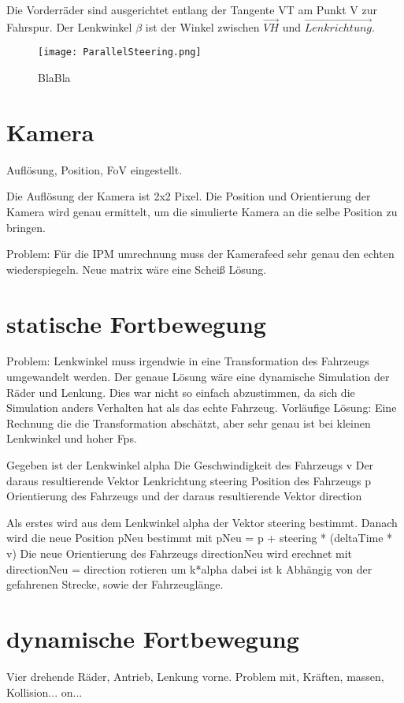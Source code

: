 Die Vorderräder sind ausgerichtet entlang der Tangente VT am Punkt V zur Fahrspur.
Der Lenkwinkel $\beta$ ist der Winkel zwischen $\vec{VH}$ und $\vec{Lenkrichtung}$. 

\begin{wrapfigure}{r}{.4\textwidth}
    \centering
    \texttt{[image: ParallelSteering.png]}
    \vspace{-15pt}
    \caption{BlaBla\footnotemark}
\end{wrapfigure}

\section{Kamera}
Auflösung, Position, FoV eingestellt.

Die Auflösung der Kamera ist 2x2 Pixel.
Die Position und Orientierung der Kamera wird genau ermittelt, um die simulierte Kamera an die selbe Position zu bringen.
 

Problem: Für die IPM umrechnung muss der Kamerafeed sehr genau den echten wiederspiegeln.
Neue matrix wäre eine Scheiß Lösung.


\section{statische Fortbewegung}
Problem: Lenkwinkel muss irgendwie in eine Transformation des Fahrzeugs umgewandelt werden.
Der genaue Lösung wäre eine dynamische Simulation der Räder und Lenkung.
Dies war nicht so einfach abzustimmen, da sich die Simulation anders Verhalten hat als das echte Fahrzeug.
Vorläufige Lösung: Eine Rechnung die die Transformation abschätzt, aber sehr genau ist bei kleinen Lenkwinkel und hoher Fps.

Gegeben ist der Lenkwinkel alpha
Die Geschwindigkeit des Fahrzeugs v
Der daraus resultierende Vektor Lenkrichtung steering
Position des Fahrzeugs p
Orientierung des Fahrzeugs und der daraus resultierende Vektor direction

Als erstes wird aus dem Lenkwinkel alpha der Vektor steering bestimmt.
Danach wird die neue Position pNeu bestimmt mit pNeu = p + steering * (deltaTime * v)
Die neue Orientierung des Fahrzeugs directionNeu wird erechnet mit directionNeu = direction rotieren um k*alpha
dabei ist k Abhängig von der gefahrenen Strecke, sowie der Fahrzeuglänge.

\section{dynamische Fortbewegung}
Vier drehende Räder, Antrieb, Lenkung vorne.
Problem mit, Kräften, massen, Kollision...
on...

